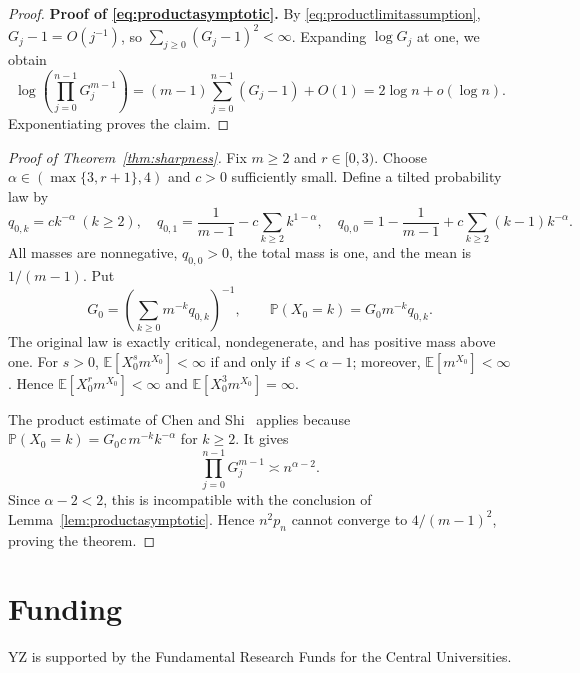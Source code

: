 \documentclass[11pt,letterpaper,reqno]{amsart}
\numberwithin{equation}{section}
\theoremstyle{plain}
\theoremstyle{remark}
\newcommand{\E}{\mathbb E}\newcommand{\Pp}{\mathbb P}
\begin{document}
\begin{proof}
\textbf{Proof of \eqref{eq:productasymptotic}.}
By \eqref{eq:productlimitassumption}, $G_j-1=O(j^{-1})$, so
$\sum_{j\ge0}(G_j-1)^2<\infty$. Expanding $\log G_j$ at one, we obtain
\[
 \log\left(\prod_{j=0}^{n-1}G_j^{m-1}\right)
 =(m-1)\sum_{j=0}^{n-1}(G_j-1)+O(1)
 =2\log n+o(\log n).
\]
Exponentiating proves the claim.
\end{proof}

\begin{proof}[Proof of Theorem~\ref{thm:sharpness}]
Fix $m\ge2$ and $r\in[0,3)$. Choose $\alpha\in(\max\{3,r+1\},4)$ and $c>0$ sufficiently small. Define a tilted probability law by
\[
 q_{0,k}=ck^{-\alpha}\ (k\ge2),\quad
 q_{0,1}=\frac1{m-1}-c\sum_{k\ge2}k^{1-\alpha},\quad
 q_{0,0}=1-\frac1{m-1}+c\sum_{k\ge2}(k-1)k^{-\alpha}.
\]
All masses are nonnegative, $q_{0,0}>0$, the total mass is one, and the mean is $1/(m-1)$. Put
\[
 G_0=\left(\sum_{k\ge0}m^{-k}q_{0,k}\right)^{-1},\qquad
 \Pp(X_0=k)=G_0m^{-k}q_{0,k}.
\]
The original law is exactly critical, nondegenerate, and has positive mass above one. For $s>0$, $\E[X_0^sm^{X_0}]<\infty$ if and only if $s<\alpha-1$; moreover, $\E[m^{X_0}]<\infty$. Hence $\E[X_0^rm^{X_0}]<\infty$ and $\E[X_0^3m^{X_0}]=\infty$.

The product estimate of Chen and Shi~\cite[Theorem~1.1]{CS} applies because $\Pp(X_0=k)=G_0c\,m^{-k}k^{-\alpha}$ for $k\ge2$. It gives
\[
 \prod_{j=0}^{n-1}G_j^{m-1}\asymp n^{\alpha-2}.
\]
Since $\alpha-2<2$, this is incompatible with the conclusion of
Lemma~\ref{lem:productasymptotic}. Hence $n^2p_n$ cannot converge to
$4/(m-1)^2$, proving the theorem.
\end{proof}
\section*{Funding}
YZ is supported by the Fundamental Research Funds for the Central Universities.

\end{document}
